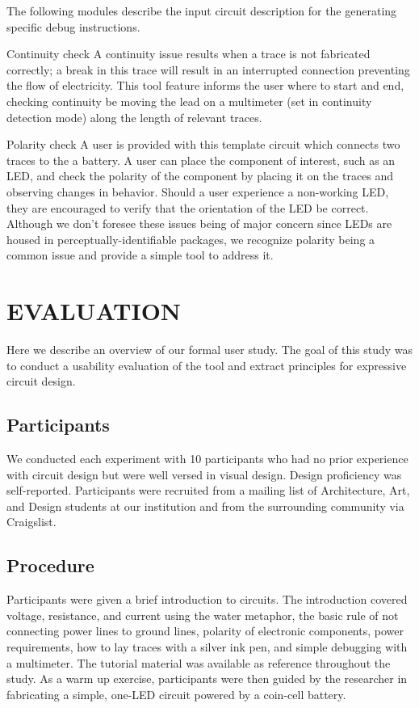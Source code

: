 \documentclass{sigchi}
\begin{document}
        The following modules describe the input circuit description for the generating specific debug instructions. 

        Continuity check
        A continuity issue results when a trace is not fabricated correctly; a break in this trace will result in an interrupted connection preventing the flow of electricity. This tool feature informs the user where to start and end, checking continuity be moving the lead on a multimeter (set in continuity detection mode) along the length of relevant traces. 
        
        Polarity check
        A user is provided with this template circuit which connects two traces to the a battery. A user can place the component of interest, such as an LED, and check the polarity of the component by placing it on the traces and observing changes in behavior. Should a user experience a non-working LED, they are encouraged to verify that the orientation of the LED be correct. Although we don't foresee these issues being of major concern since LEDs are housed in perceptually-identifiable packages, we recognize polarity being a common issue and provide a simple tool to address it. 

        
    
        
\section{EVALUATION}
    Here we describe an overview of our formal user study. The goal of this study was to conduct a usability evaluation of the tool and extract principles for expressive circuit design. 

\subsection{Participants}
    We conducted each experiment with 10 participants who had no prior experience with circuit design but were well versed in visual design. Design proficiency was self-reported. Participants were recruited from a mailing list of Architecture, Art, and Design students at our institution and from the surrounding community via Craigslist. 
    
\subsection{Procedure}
    Participants were given a brief introduction to circuits. The introduction covered voltage, resistance, and current using the water metaphor, the basic rule of not connecting power lines to ground lines, polarity of electronic components, power requirements, how to lay traces with a silver ink pen, and simple debugging with a multimeter. The tutorial material was available as reference throughout the study. As a warm up exercise, participants were then guided by the researcher in fabricating a simple, one-LED circuit powered by a coin-cell battery.   
\end{document}
